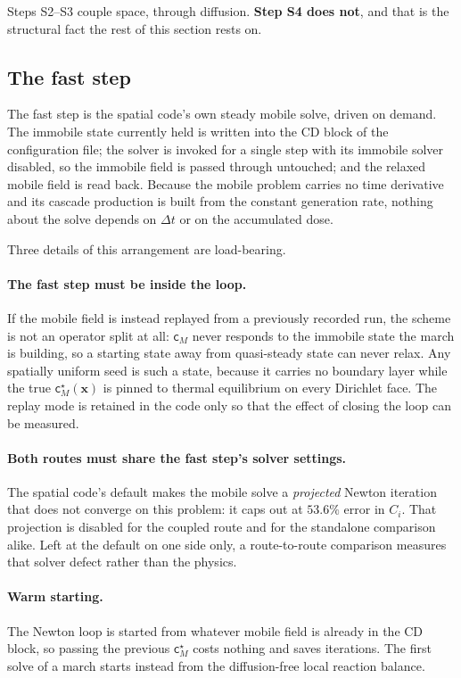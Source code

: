 \documentclass{article}
\newcommand{\spvec}[1]{\bm{\mathsf{#1}}}   %
\begin{document}
Steps S2--S3 couple space, through diffusion. \textbf{Step S4 does not}, and that
is the structural fact the rest of this section rests on.

\subsection{The fast step}
\label{sec:fast}

The fast step is the spatial code's own steady mobile solve, driven on demand.
The immobile state currently held is written into the CD block of the
configuration file; the solver is invoked for a single step with its immobile
solver disabled, so the immobile field is passed through untouched; and the
relaxed mobile field is read back. Because the mobile problem carries no time
derivative and its cascade production is built from the constant generation rate,
nothing about the solve depends on $\Delta t$ or on the accumulated dose.

Three details of this arrangement are load-bearing.

\paragraph{The fast step must be inside the loop.} If the mobile field is
instead replayed from a previously recorded run, the scheme is not an operator
split at all: $\spvec c_M$ never responds to the immobile state the march is
building, so a starting state away from quasi-steady state can never relax. Any
spatially uniform seed is such a state, because it carries no boundary layer
while the true $\spvec c^\star_M(\bm x)$ is pinned to thermal equilibrium on every
Dirichlet face. The replay mode is retained in the code only so that the effect
of closing the loop can be measured.

\paragraph{Both routes must share the fast step's solver settings.} The spatial
code's default makes the mobile solve a \emph{projected} Newton iteration that
does not converge on this problem: it caps out at $53.6\%$ error in $C_i$. That
projection is disabled for the coupled route and for the standalone comparison
alike. Left at the default on one side only, a route-to-route comparison measures
that solver defect rather than the physics.

\paragraph{Warm starting.} The Newton loop is started from whatever mobile field
is already in the CD block, so passing the previous $\spvec c^\star_M$ costs
nothing and saves iterations. The first solve of a march starts instead from the
diffusion-free local reaction balance.
\end{document}
